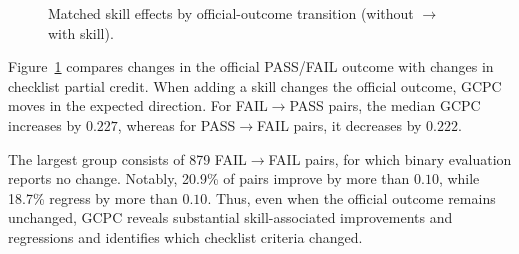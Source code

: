 \documentclass[sigconf,nonacm]{acmart}
\begin{document}
\begin{figure}[t]
{}

\caption{Matched skill effects by official-outcome transition
(without $\rightarrow$ with skill).} %

\label{fig:skill-transitions}
\end{figure}

Figure~\ref{fig:skill-transitions} compares changes in the official PASS/FAIL
outcome with changes in checklist partial credit. When adding a skill changes
the official outcome, GCPC moves in the expected direction. For
FAIL$\rightarrow$PASS pairs, the median GCPC increases by $0.227$, whereas
for PASS$\rightarrow$FAIL pairs, it decreases by $0.222$.

The largest group consists of 879 FAIL$\rightarrow$FAIL pairs, for which
binary evaluation reports no change. Notably, 20.9\% of pairs improve by more than $0.10$, while 18.7\% regress by more than $0.10$. Thus, even when the official outcome remains unchanged, GCPC reveals substantial skill-associated improvements and
regressions and identifies which checklist criteria changed.
\end{document}
